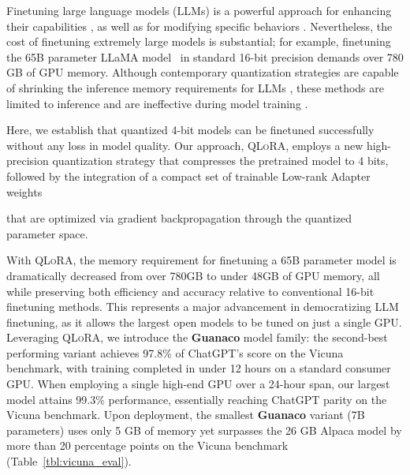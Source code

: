 Finetuning large language models (LLMs) is a powerful approach for enhancing their capabilities \citep{min2021metaicl, wei2021finetuned, ouyang2022training, wang2022super, wang2022self, liu2022few}, as well as for modifying specific behaviors \citep{ouyang2022training,askell2021general,bai2022training}. Nevertheless, the cost of finetuning extremely large models is substantial; for example, finetuning the 65B parameter LLaMA model~\citep{touvron2023llama} in standard 16-bit precision demands over 780 GB of GPU memory. Although contemporary quantization strategies are capable of shrinking the inference memory requirements for LLMs \citep{dettmers2022llm, dettmers2022case, frantar2022gptq, xiao2022smoothquant}, these methods are limited to inference and are ineffective during model training \citep{wortsman2023stable}.

Here, we establish that quantized 4-bit models can be finetuned successfully without any loss in model quality. Our approach, \textsc{QLoRA}, employs a new high-precision quantization strategy that compresses the pretrained model to 4 bits, followed by the integration of a compact set of trainable Low-rank Adapter weights \citep{hu2021lora} 

that are optimized via gradient backpropagation through the quantized parameter space.

With \textsc{QLoRA}, the memory requirement for finetuning a 65B parameter model is dramatically decreased from over 780GB to under 48GB of GPU memory, all while preserving both efficiency and accuracy relative to conventional 16-bit finetuning methods. This represents a major advancement in democratizing LLM finetuning, as it allows the largest open models to be tuned on just a single GPU. Leveraging \textsc{QLoRA}, we introduce the \textbf{Guanaco} model family: the second-best performing variant achieves 97.8\% of ChatGPT’s score on the Vicuna~\citep{vicuna2023} benchmark, with training completed in under 12 hours on a standard consumer GPU. When employing a single high-end GPU over a 24-hour span, our largest model attains 99.3\% performance, essentially reaching ChatGPT parity on the Vicuna benchmark. Upon deployment, the smallest \textbf{Guanaco} variant (7B parameters) uses only 5 GB of memory yet surpasses the 26 GB Alpaca model by more than 20 percentage points on the Vicuna benchmark (Table~\ref{tbl:vicuna_eval}).

